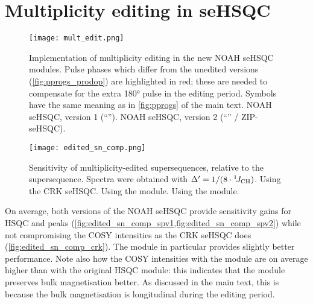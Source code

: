 \section{Multiplicity editing in seHSQC}

\begin{figure}
    \centering
    \texttt{[image: mult\_edit.png]}
    {\label{fig:mult_edit_spv1}}
    {\label{fig:mult_edit_spv2}}
    \caption{
        Implementation of multiplicity editing in the new NOAH seHSQC modules.
        Pulse phases which differ from the unedited versions (\cref{fig:pprogs_prodop}) are highlighted in red; these are needed to compensate for the extra \proton{} \ang{180} pulse in the editing period.
        Symbols have the same meaning as in \cref{fig:pprogs} of the main text.
        \textbf{} NOAH seHSQC, version 1 (``\noahSpa{}'').
        \textbf{} NOAH seHSQC, version 2 (``\noahSpb{}'' / ZIP-seHSQC).
    }
    \label{fig:mult_edit}
\end{figure}

\begin{figure}
    \centering
    \texttt{[image: edited\_sn\_comp.png]}
    {\label{fig:edited_sn_comp_crk}}
    {\label{fig:edited_sn_comp_spv1}}
    {\label{fig:edited_sn_comp_spv2}}
    \caption{
        Sensitivity of multiplicity-edited  supersequences, relative to the  supersequence.
        Spectra were obtained with $\Delta' = 1/(8\cdot\onejch)$.
        \textbf{} Using the CRK seHSQC.
        \textbf{} Using the \noahSpa{} module.
        \textbf{} Using the \noahSpb{} module.
        \andro{}
    }
    \label{fig:edited_sn_comp}
\end{figure}

On average, both versions of the NOAH seHSQC provide sensitivity gains for HSQC  and  peaks (\cref{fig:edited_sn_comp_spv1,fig:edited_sn_comp_spv2}) while not compromising the COSY intensities as the CRK seHSQC does (\cref{fig:edited_sn_comp_crk}).
The \noahSpb{} module in particular provides slightly better performance.
Note also how the COSY intensities with the \noahSpb{} module are on average higher than with the original HSQC module: this indicates that the \noahSpb{} module preserves bulk  magnetisation better.
As discussed in the main text, this is because the bulk magnetisation is longitudinal during the editing period.

